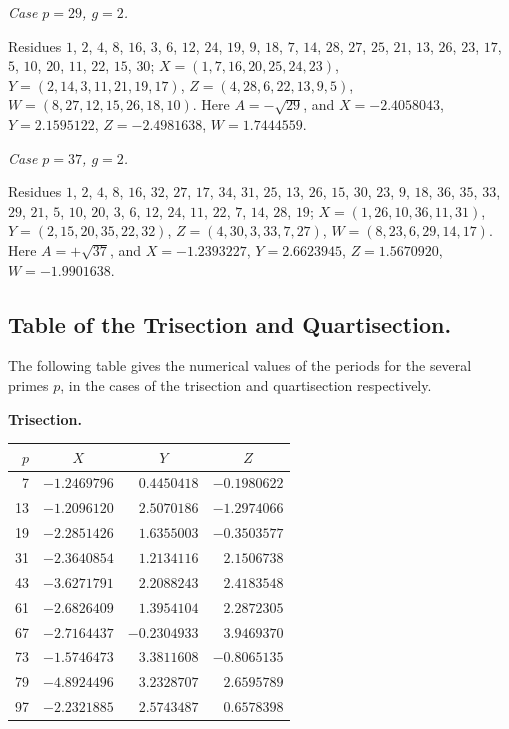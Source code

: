 \documentclass[11pt,a4paper]{book}
\begin{document}
\textit{Case $p=29$, $g=2$.}

Residues $1$, $2$, $4$, $8$, $16$, $3$, $6$, $12$, $24$, $19$, $9$, $18$,
$7$, $14$, $28$, $27$, $25$, $21$, $13$, $26$, $23$, $17$, $5$, $10$, $20$,
$11$, $22$, $15$, $30$; $X=(1,7,16,20,25,24,23)$,
$Y=(2,14,3,11,21,19,17)$, $Z=(4,28,6,22,13,9,5)$,
$W=(8,27,12,15,26,18,10)$. Here $A=-\sqrt{29}$, and
$X=-2.4058043$, $Y=2.1595122$, $Z=-2.4981638$, $W=1.7444559$.

\textit{Case $p=37$, $g=2$.}

Residues $1$, $2$, $4$, $8$, $16$, $32$, $27$, $17$, $34$, $31$, $25$,
$13$, $26$, $15$, $30$, $23$, $9$, $18$, $36$, $35$, $33$, $29$, $21$,
$5$, $10$, $20$, $3$, $6$, $12$, $24$, $11$, $22$, $7$, $14$, $28$, $19$;
$X=(1,26,10,36,11,31)$, $Y=(2,15,20,35,22,32)$,
$Z=(4,30,3,33,7,27)$, $W=(8,23,6,29,14,17)$.
Here $A=+\sqrt{37}$, and $X=-1.2393227$, $Y=2.6623945$,
$Z=1.5670920$, $W=-1.9901638$.

\newpage
\subsection*{Table of the Trisection and Quartisection.}

The following table gives the numerical values of the periods for the
several primes $p$, in the cases of the trisection and quartisection respectively.

\begin{center}
\textbf{Trisection.}
\end{center}

\begin{center}
\begin{tabular}{r|rrr}
\toprule
$p$ & \multicolumn{1}{c}{$X$} & \multicolumn{1}{c}{$Y$} & \multicolumn{1}{c}{$Z$} \\
\midrule
7  & $-1.2469796$ & $0.4450418$ & $-0.1980622$ \\
13 & $-1.2096120$ & $2.5070186$ & $-1.2974066$ \\
19 & $-2.2851426$ & $1.6355003$ & $-0.3503577$ \\
31 & $-2.3640854$ & $1.2134116$ & $2.1506738$ \\
43 & $-3.6271791$ & $2.2088243$ & $2.4183548$ \\
61 & $-2.6826409$ & $1.3954104$ & $2.2872305$ \\
67 & $-2.7164437$ & $-0.2304933$ & $3.9469370$ \\
73 & $-1.5746473$ & $3.3811608$ & $-0.8065135$ \\
79 & $-4.8924496$ & $3.2328707$ & $2.6595789$ \\
97 & $-2.2321885$ & $2.5743487$ & $0.6578398$ \\
\bottomrule
\end{tabular}
\end{center}
\end{document}
